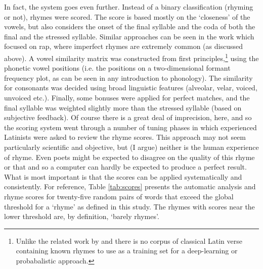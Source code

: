 \documentclass[twocolumn, switch, a4paper]{article} %
\begin{document}
In fact, the system goes even further. Instead of a binary classification
(rhyming or not), rhymes were scored. The score is based mostly on the
`closeness' of the vowels, but also considers the onset of the final syllable
and the coda of both the final and the stressed syllable. Similar approaches
can be seen in the work which focused on rap, where imperfect rhymes are
extremely common (as discussed above). A vowel similarity matrix was
constructed from first principles,\footnote{
  Unlike the related work by  and
   there is no corpus of classical Latin verse
  containing known rhymes to use as a training set for a deep-learning or
  probabalistic approach.
}
using the phonetic vowel positions (i.e. the positions on a two-dimensional
formant frequency plot, as can be seen in any introduction to phonology). The
similarity for consonants was decided using broad linguistic features
(alveolar, velar, voiced, unvoiced etc.). Finally, some bonuses were applied
for perfect matches, and the final syllable was weighted slightly more than
the stressed syllable (based on subjective feedback). Of course there is a
great deal of imprecision, here, and so the scoring system went through a
number of tuning phases in which experienced Latinists were asked to review
the rhyme scores. This approach may not seem particularly scientific and
objective, but (I argue) neither is the human experience of rhyme. Even poets
might be expected to disagree on the quality of this rhyme or that and so a
computer can hardly be expected to produce a perfect result. What is most
important is that the scores can be applied systematically and consistently.
For reference, Table \ref{tab:scores} presents the automatic analysis and
rhyme scores for twenty-five random pairs of words that exceed the global
threshold for a `rhyme' as defined in this study. The rhymes with scores near
the lower threshold are, by definition, `barely rhymes'.
\end{document}
